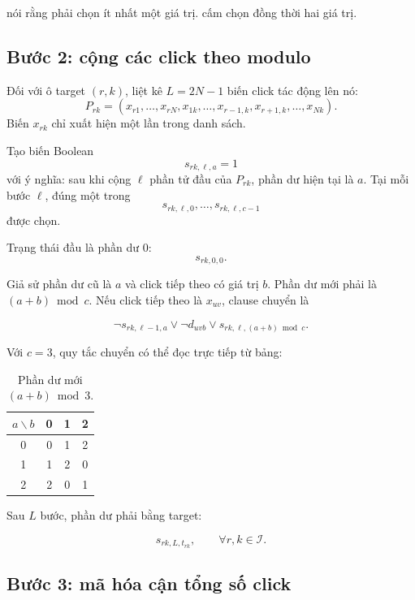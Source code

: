 \documentclass[11pt,a4paper]{article}
\newcommand{\I}{\mathcal{I}}
\begin{document}
 nói rằng phải chọn ít nhất một giá trị.
 cấm chọn đồng thời hai giá trị.

\subsection{Bước 2: cộng các click theo modulo}

Đối với ô target $(r,k)$, liệt kê $L=2N-1$ biến click tác động lên nó:
\[
P_{rk}=
(x_{r1},\ldots,x_{rN},
x_{1k},\ldots,x_{r-1,k},x_{r+1,k},\ldots,x_{Nk}).
\]
Biến $x_{rk}$ chỉ xuất hiện một lần trong danh sách.

Tạo biến Boolean
\[
  s_{rk,\ell,a}=1
\]
với ý nghĩa: sau khi cộng $\ell$ phần tử đầu của $P_{rk}$, phần dư hiện tại
là $a$. Tại mỗi bước $\ell$, đúng một trong
\[
  s_{rk,\ell,0},\ldots,s_{rk,\ell,c-1}
\]
được chọn.

Trạng thái đầu là phần dư 0:
\begin{equation}\label{eq:sat-start}
  s_{rk,0,0}.
\end{equation}

Giả sử phần dư cũ là $a$ và click tiếp theo có giá trị $b$. Phần dư mới
phải là $(a+b)\bmod c$. Nếu click tiếp theo là $x_{uv}$, clause chuyển là

\begin{equation}\label{eq:sat-transition}
  \lnot s_{rk,\ell-1,a}
  \lor
  \lnot d_{uvb}
  \lor
  s_{rk,\ell,(a+b)\bmod c}.
\end{equation}

Với $c=3$, quy tắc chuyển có thể đọc trực tiếp từ bảng:

\begin{table}[htbp]
\centering
\caption{Phần dư mới $(a+b)\bmod3$.}
\label{tab:mod3}
\begin{tabular}{c|ccc}
\toprule
$a\backslash b$ & 0 & 1 & 2\\
\midrule
0 & 0 & 1 & 2\\
1 & 1 & 2 & 0\\
2 & 2 & 0 & 1\\
\bottomrule
\end{tabular}
\end{table}

Sau $L$ bước, phần dư phải bằng target:

\begin{equation}\label{eq:sat-finish}
  s_{rk,L,t_{rk}},
  \qquad \forall r,k\in\I.
\end{equation}

\subsection{Bước 3: mã hóa cận tổng số click}
\end{document}
